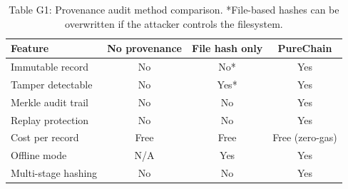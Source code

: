 \begin{table}[ht]
\caption{Table G1: Provenance audit method comparison. *File-based hashes can be overwritten if the attacker controls the filesystem.}
\label{tab:provenance}
\centering\small
\begin{tabular}{lccc}
\toprule
Feature & No provenance & File hash only & PureChain \\
\midrule
Immutable record & No & No* & Yes \\
Tamper detectable & No & Yes* & Yes \\
Merkle audit trail & No & No & Yes \\
Replay protection & No & No & Yes \\
Cost per record & Free & Free & Free (zero-gas) \\
Offline mode & N/A & Yes & Yes \\
Multi-stage hashing & No & No & Yes \\
\bottomrule
\end{tabular}
\end{table}
